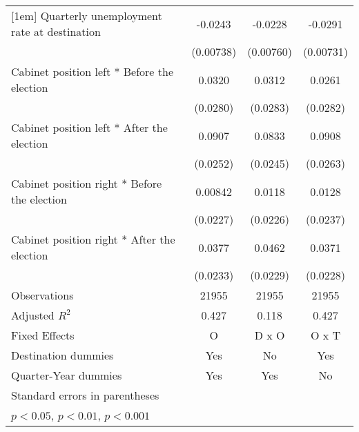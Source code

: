 \begin{table}[htbp]
\begin{tabular}{l*{3}{c}}
[1em]
Quarterly unemployment rate at destination&     -0.0243\sym{**} &     -0.0228\sym{**} &     -0.0291\sym{***}\\
                    &   (0.00738)         &   (0.00760)         &   (0.00731)         \\
[1em]
Cabinet position left * Before the election&      0.0320         &      0.0312         &      0.0261         \\
                    &    (0.0280)         &    (0.0283)         &    (0.0282)         \\
[1em]
Cabinet position left * After the election&      0.0907\sym{***}&      0.0833\sym{**} &      0.0908\sym{**} \\
                    &    (0.0252)         &    (0.0245)         &    (0.0263)         \\
[1em]
Cabinet position right * Before the election&     0.00842         &      0.0118         &      0.0128         \\
                    &    (0.0227)         &    (0.0226)         &    (0.0237)         \\
[1em]
Cabinet position right * After the election&      0.0377         &      0.0462\sym{*}  &      0.0371         \\
                    &    (0.0233)         &    (0.0229)         &    (0.0228)         \\
\hline
Observations        &       21955         &       21955         &       21955         \\
Adjusted \(R^{2}\)  &       0.427         &       0.118         &       0.427         \\
Fixed Effects       &           O         &       D x O         &       O x T         \\
Destination dummies &         Yes         &          No         &         Yes         \\
Quarter-Year dummies&         Yes         &         Yes         &          No         \\
\hline\hline
\multicolumn{4}{l}{\footnotesize Standard errors in parentheses}\\
\multicolumn{4}{l}{\footnotesize \sym{*} \(p<0.05\), \sym{**} \(p<0.01\), \sym{***} \(p<0.001\)}\\
\end{tabular}
\end{table}
